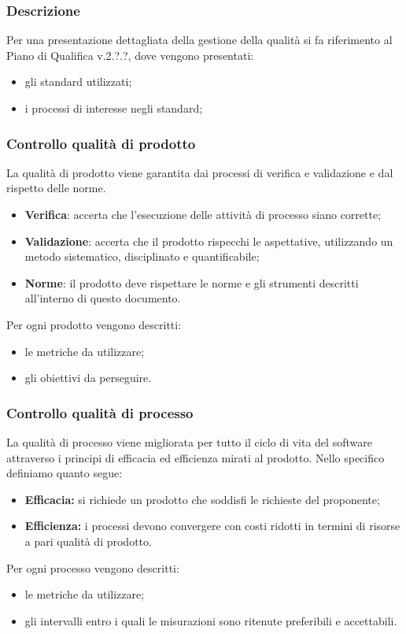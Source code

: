 		\subsubsection{Descrizione}
		Per una presentazione dettagliata della gestione della qualità si fa riferimento al Piano di Qualifica v.2.?.?, dove vengono presentati:
		\begin{itemize}
			\item gli standard utilizzati;
			\item i processi di interesse negli standard;
		\end{itemize}
		\subsubsection{Controllo qualità di prodotto}
		La qualità di prodotto viene garantita dai processi di verifica e validazione e dal rispetto delle norme.
		\begin{itemize}
			\item \textbf{Verifica}: accerta che l’esecuzione delle attività di processo siano corrette;
			\item \textbf{Validazione}: accerta che il prodotto rispecchi le aspettative, utilizzando un metodo sistematico, disciplinato e quantificabile;
			\item \textbf{Norme}:   il  prodotto  deve  rispettare  le  norme  e  gli  strumenti  descritti  all’interno  di  questo documento.
		\end{itemize}
		Per ogni prodotto vengono descritti: 
		\begin{itemize}
			\item le metriche da utilizzare;
			\item gli obiettivi da perseguire.
			\end{itemize}
		\subsubsection{Controllo qualità di processo}
		La qualità di processo viene migliorata per tutto il ciclo di vita del software attraverso i principi di efficacia ed efficienza mirati al prodotto.
			Nello specifico definiamo quanto segue:
			\begin{itemize}
				\item \textbf{Efficacia:} si richiede un prodotto che soddisfi le richieste del proponente;
				\item \textbf{Efficienza:} i processi devono convergere con costi ridotti in termini di risorse a pari qualità di prodotto.
			\end{itemize}
			Per ogni processo vengono descritti: 
			\begin{itemize}
			\item le metriche da utilizzare;
			\item gli intervalli entro i quali le misurazioni sono ritenute preferibili e accettabili.
			\end{itemize}
